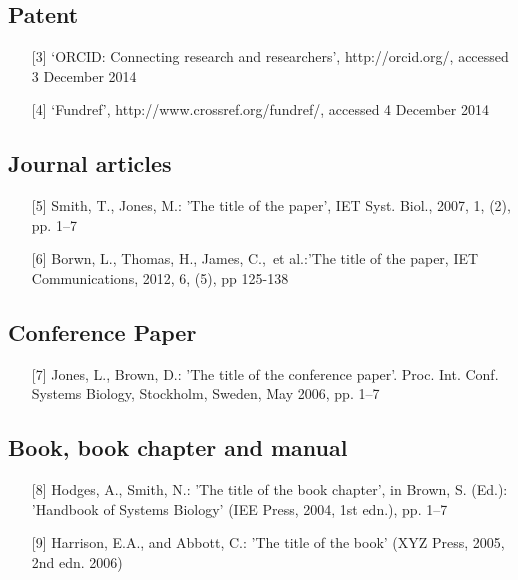 \documentclass{cta-author}
\begin{document}
\subsection{Patent}\label{subsec13.2}

\begin{enumerate}
\item[{[3]}] `ORCID: Connecting research and researchers', http://orcid.org/,
accessed 3 December 2014\vspace*{6pt}

\item[{[4]}]
`Fundref', http://www.crossref.org/fundref/, accessed 4 December 2014
\end{enumerate}

\subsection{Journal articles}\label{subsec13.3}

\begin{enumerate}
\item[{[5]}] Smith, T., Jones, M.: 'The title of the paper', IET Syst. Biol., 2007,
1, (2), pp. 1--7\vspace*{6pt}

\item[{[6]}] Borwn, L., Thomas, H., James, C.,~et al.:'The title of the paper, IET
Communications, 2012, 6, (5), pp 125-138
\end{enumerate}

\subsection{Conference Paper}\label{subsec13.4}

\begin{enumerate}
\item[{[7]}]
Jones, L., Brown, D.: 'The title of the conference paper'. Proc. Int.
Conf. Systems Biology, Stockholm, Sweden, May 2006, pp. 1--7
\end{enumerate}

\subsection{Book, book chapter and manual}\label{subsec13.5}

\begin{enumerate}
\item[{[8]}] Hodges, A., Smith, N.: 'The title of the book chapter', in Brown, S.
(Ed.): 'Handbook of Systems Biology' (IEE Press, 2004, 1st edn.), pp. 1--7\vspace*{6pt}

\item[{[9]}]
Harrison, E.A., and Abbott, C.: 'The title of the book' (XYZ Press,
2005, 2nd edn. 2006)
\end{enumerate}
\end{document}
